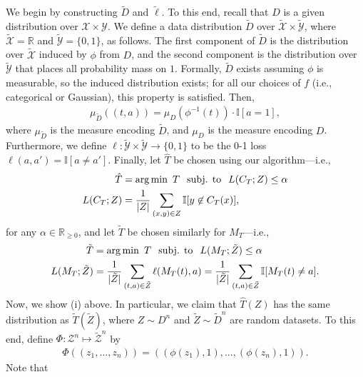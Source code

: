 \documentclass{article} \usepackage{iclr2020_conference,times}
\renewcommand{\(}						{\left(}
\renewcommand{\)}						{\right)}
\renewcommand{\[}						{\left[}
\renewcommand{\]}						{\right]}
\newcommand{\<}						{\left<}
\renewcommand{\>}						{\right>}
\def\Xs{\mathcal{{X}}}
\def\Ys{\mathcal{{Y}}}
\begin{document}
We begin by constructing $\tilde D$ and $\tilde\ell$. To this end, recall that $D$ is a given distribution over $\Xs \times \Ys$. We define a data distribution $\tilde{D}$ over $\tilde{\mathcal{X}}\times\tilde{\mathcal{Y}}$, where $\tilde{\mathcal{X}}=\mathbb{R}$ and $\tilde{\mathcal{Y}}=\{0,1\}$, as follows. The first component of $\tilde{D}$ is the distribution over $\tilde{\mathcal{X}}$ induced by $\phi$ from $D$, and the second component is the distribution over $\tilde{\mathcal{Y}}$ that places all probability mass on $1$. Formally, $\tilde{D}$ exists assuming $\phi$ is measurable, so the induced distribution exists; for all our choices of $f$ (i.e., categorical or Gaussian), this property is satisfied. Then,
\begin{align*}
	\mu_{\tilde{D}}((t,a)) = \mu_D(\phi^{-1}(t))\cdot\mathbb{I}[a=1],
\end{align*}
where $\mu_{\tilde{D}}$ is the measure encoding $\tilde{D}$, and $\mu_D$ is the measure encoding $D$.
Furthermore, we define $\ell:\tilde{\mathcal{Y}}\times\tilde{\mathcal{Y}}\to\{0,1\}$ to be the 0-1 loss $\ell(a,a')=\mathbb{I}[a\neq a']$. Finally, let $\hat T$ be chosen using our algorithm---i.e.,
\begin{align*}
\hat T&=\operatorname*{\arg\min}~T\hspace{0.1in}\text{subj. to}\hspace{0.1in}L(C_T;Z)\le\alpha \\
L(C_T;Z)&=\frac{1}{|Z|}\sum_{(x,y)\in Z}\mathbb{I}[y\not\in C_T(x)],
\end{align*}
for any $\alpha\in\mathbb{R}_{\ge0}$,
and let $\tilde T$ be chosen similarly for $M_T$---i.e.,
\begin{align*}
\tilde T&=\operatorname*{\arg\min}~T\hspace{0.1in}\text{subj. to}\hspace{0.1in}L(M_T;\tilde Z)\le\alpha \\
L(M_T;\tilde Z) &= \frac{1}{|\tilde Z|}\sum_{(t,a)\in\tilde Z}\ell(M_T(t),a) = \frac{1}{|\tilde Z|}\sum_{(t,a)\in\tilde Z}\mathbb{I}[M_T(t) \neq a].
\end{align*}
Now, we show (i) above. In particular, we claim that $\hat T(Z)$ has the same distribution as $\tilde T(\tilde Z)$, where $Z\sim D^n$ and $\tilde Z\sim\tilde D^n$ are random datasets. To this end, define $\Phi:\mathcal{Z}^n\mapsto\tilde{\mathcal{Z}}^n$ by
\begin{align*}
\Phi((z_1,...,z_n)) = ((\phi(z_1),1), ..., (\phi(z_n),1)).
\end{align*}
Note that
\end{document}
